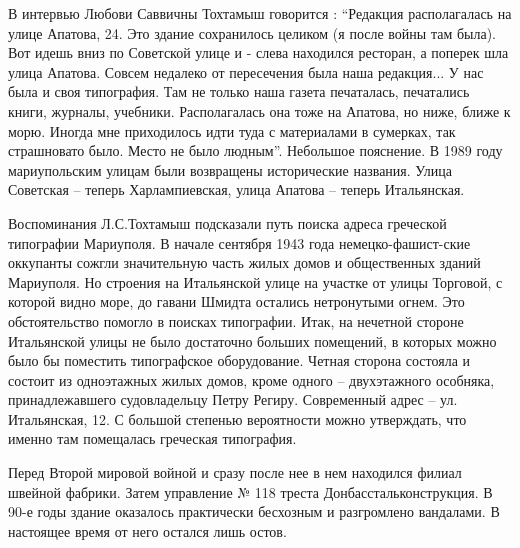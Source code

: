 В интервью  Любови Саввичны Тохтамыш говорится : \enquote{Редакция располагалась на
улице Апатова, 24. Это здание сохранилось целиком (я после войны там была). Вот
идешь вниз по Советской улице и - слева находился ресторан, а поперек шла улица
Апатова. Совсем  недалеко от пересечения была наша редакция... У нас была и
своя типография. Там не только наша газета печаталась, печатались книги,
журналы, учебники. Располагалась она тоже на Апатова, но ниже, ближе к морю.
Иногда мне приходилось идти туда с материалами в сумерках, так страшновато
было. Место не было людным}. Небольшое пояснение. В 1989 году мариупольским
улицам были возвращены исторические названия. Улица Советская – теперь
Харлампиевская, улица Апатова – теперь Итальянская.

Воспоминания Л.С.Тохтамыш  подсказали путь поиска адреса греческой типографии
Мариуполя. В начале сентября 1943 года немецко-фашист\hyp{}ские оккупанты сожгли
значительную часть жилых домов и общественных зданий Мариуполя. Но строения на
Итальянской  улице на участке от улицы Торговой, с которой видно море, до
гавани Шмидта остались нетронутыми огнем. Это обстоятельство помогло в поисках
типографии.  Итак, на нечетной стороне  Итальянской улицы не было достаточно
больших помещений, в которых можно было бы поместить типографское оборудование.
Четная сторона состояла и состоит из одноэтажных жилых домов, кроме одного –
двухэтажного особняка, принадлежавшего  судовладельцу Петру Региру.
Современный адрес – ул. Итальянская, 12. С большой степенью вероятности можно
утверждать, что именно там помещалась греческая типография.

Перед Второй мировой войной  и сразу после нее в нем находился филиал швейной
фабрики. Затем управление № 118 треста Донбасстальконструкция.  В 90-е годы
здание оказалось практически бесхозным и разгромлено вандалами.  В настоящее
время от него остался  лишь остов.
